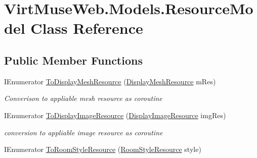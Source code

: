 \hypertarget{class_virt_muse_web_1_1_models_1_1_resource_model}{}\section{Virt\+Muse\+Web.\+Models.\+Resource\+Model Class Reference}
\label{class_virt_muse_web_1_1_models_1_1_resource_model}
\subsection*{Public Member Functions}
\begin{DoxyCompactItemize}
\item 
I\+Enumerator \mbox{\hyperlink{class_virt_muse_web_1_1_models_1_1_resource_model_a57f31b86ab776544b1f5480d7efc1a9c}{To\+Display\+Mesh\+Resource}} (\mbox{\hyperlink{class_display_mesh_resource}{Display\+Mesh\+Resource}} m\+Res)
\begin{DoxyCompactList}\small\item\em Converison to appliable mesh resource as coroutine \end{DoxyCompactList}\item 
I\+Enumerator \mbox{\hyperlink{class_virt_muse_web_1_1_models_1_1_resource_model_a4ff757b0ed17663d3d503dbb4decff7b}{To\+Display\+Image\+Resource}} (\mbox{\hyperlink{class_display_image_resource}{Display\+Image\+Resource}} img\+Res)
\begin{DoxyCompactList}\small\item\em conversion to appliable image resource as coroutine \end{DoxyCompactList}\item 
I\+Enumerator \mbox{\hyperlink{class_virt_muse_web_1_1_models_1_1_resource_model_ae85d25e8e130285ea18964b535f82f41}{To\+Room\+Style\+Resource}} (\mbox{\hyperlink{class_room_style_resource}{Room\+Style\+Resource}} style)
\end{DoxyCompactItemize}
